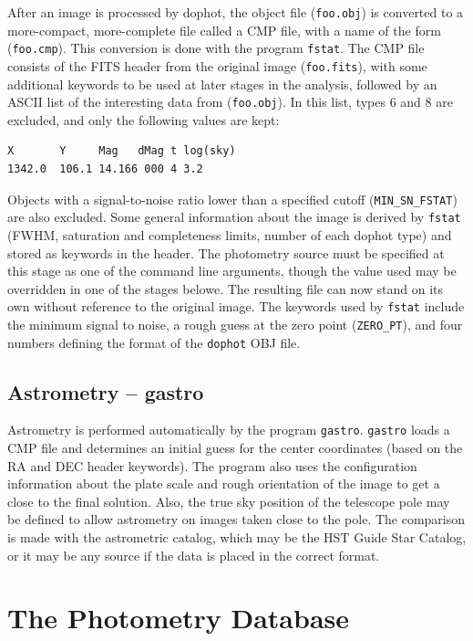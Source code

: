 \documentclass{article}
\begin{document}
After an image is processed by dophot, the object file ({\tt foo.obj})
is converted to a more-compact, more-complete file called a CMP file,
with a name of the form ({\tt foo.cmp}).  This conversion is done with
the program {\tt fstat}.  The CMP file consists of the FITS header
from the original image ({\tt foo.fits}), with some additional
keywords to be used at later stages in the analysis, followed by an
ASCII list of the interesting data from ({\tt foo.obj}).  In this
list, types 6 and 8 are excluded, and only the following values are
kept:
\begin{verbatim}
X       Y     Mag   dMag t log(sky) 
1342.0  106.1 14.166 000 4 3.2
\end{verbatim}
Objects with a signal-to-noise ratio lower than a specified cutoff
({\tt MIN\_SN\_FSTAT}) are also excluded.  Some general information
about the image is derived by {\tt fstat} (FWHM, saturation and
completeness limits, number of each dophot type) and stored as
keywords in the header.  The photometry source must be specified at
this stage as one of the command line arguments, though the value used
may be overridden in one of the stages belowe.  The resulting file can
now stand on its own without reference to the original image.  The
keywords used by {\tt fstat} include the minimum signal to noise, a
rough guess at the zero point ({\tt ZERO\_PT}), and four numbers
defining the format of the {\tt dophot} OBJ file.

\subsection{Astrometry -- gastro}

Astrometry is performed automatically by the program {\tt gastro}.
{\tt gastro} loads a CMP file and determines an initial guess for the
center coordinates (based on the RA and DEC header keywords).  The
program also uses the configuration information about the plate scale
and rough orientation of the image to get a close to the final
solution.  Also, the true sky position of the telescope pole may be
defined to allow astrometry on images taken close to the pole.  The
comparison is made with the astrometric catalog, which may be the HST
Guide Star Catalog, or it may be any source if the data is placed in
the correct format.

\section{The Photometry Database}
\end{document}
